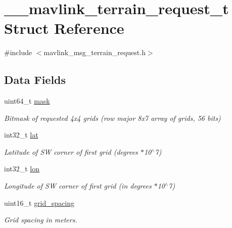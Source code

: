 \hypertarget{struct____mavlink__terrain__request__t}{\section{\+\_\+\+\_\+mavlink\+\_\+terrain\+\_\+request\+\_\+t Struct Reference}
\label{struct____mavlink__terrain__request__t}
}


{\ttfamily \#include $<$mavlink\+\_\+msg\+\_\+terrain\+\_\+request.\+h$>$}

\subsection*{Data Fields}
\begin{DoxyCompactItemize}
\item 
uint64\+\_\+t \hyperlink{struct____mavlink__terrain__request__t_a81eac7818d26faaa87b3770a79f4570b}{mask}
\begin{DoxyCompactList}\small\item\em Bitmask of requested 4x4 grids (row major 8x7 array of grids, 56 bits) \end{DoxyCompactList}\item 
int32\+\_\+t \hyperlink{struct____mavlink__terrain__request__t_ad380952916838f9fca5b0c55516bf965}{lat}
\begin{DoxyCompactList}\small\item\em Latitude of S\+W corner of first grid (degrees $\ast$10$^\wedge$7) \end{DoxyCompactList}\item 
int32\+\_\+t \hyperlink{struct____mavlink__terrain__request__t_a5fb5ef1cc52e2243db460cb653369b68}{lon}
\begin{DoxyCompactList}\small\item\em Longitude of S\+W corner of first grid (in degrees $\ast$10$^\wedge$7) \end{DoxyCompactList}\item 
uint16\+\_\+t \hyperlink{struct____mavlink__terrain__request__t_ab6740d52e135fe0c33d3ed2f0556a039}{grid\+\_\+spacing}
\begin{DoxyCompactList}\small\item\em Grid spacing in meters. \end{DoxyCompactList}\end{DoxyCompactItemize}


